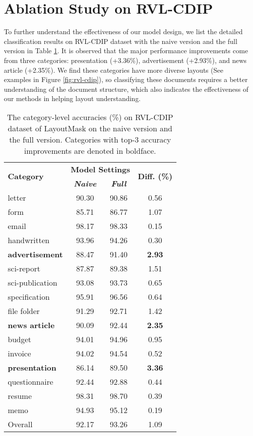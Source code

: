 \documentclass[11pt]{article}
\begin{document}
\section{Ablation Study on RVL-CDIP}
\label{appendix:rvl-cdip}
To further understand the effectiveness of our model design, we list the detailed classification results on RVL-CDIP dataset with the naive version and the full version in Table \ref{table:rvlcdip-compare}.  
It is observed that the major performance improvements come from three categories: presentation (+3.36\%), advertisement (+2.93\%), and news article (+2.35\%).
We find these categories have more diverse layouts (See examples in Figure \ref{fig:rvl-cdip}), so classifying these documents requires a better understanding of the document structure, which also indicates the effectiveness of our methods in helping layout understanding.  





 \begin{table}[!tb]
\centering
\begin{tabular}{l|cc|c}
\hline
\multirow{2}{*}{\textbf{Category}} & \multicolumn{2}{c|}{\textbf{Model Settings}} & \multirow{2}{*}{\textbf{Diff. (\%)}} \\ \cline{2-3}
        & \textbf{\textit{Naive}} & \textbf{\textit{Full}} & \\ \hline
letter         & 90.30      & 90.86   & 0.56 \\
form          & 85.71      & 86.77   & 1.07 \\
email         & 98.17      & 98.33   & 0.15 \\
handwritten      & 93.96      & 94.26   & 0.30 \\
\textbf{advertisement}     & 88.47      & 91.40   & \textbf{2.93} \\
sci-report   & 87.87      & 89.38   & 1.51 \\
sci-publication & 93.08      & 93.73   & 0.65 \\
specification     & 95.91      & 96.56   & 0.64 \\
file folder      & 91.29      & 92.71   & 1.42 \\
\textbf{news article}      & 90.09      & 92.44   & \textbf{2.35} \\
budget         & 94.01      & 94.96   & 0.95 \\
invoice        & 94.02      & 94.54   & 0.52 \\
\textbf{presentation}      & 86.14      &89.50   & \textbf{3.36} \\
questionnaire     & 92.44      & 92.88   & 0.44 \\
resume         & 98.31      & 98.70   & 0.39 \\
memo          & 94.93      & 95.12   & 0.19 \\ \hline
Overall        & 92.17      & 93.26   & 1.09 \\ \hline
\end{tabular}
\caption{\label{table:rvlcdip-compare}
The category-level accuracies (\%) on RVL-CDIP dataset of LayoutMask on the naive version and the full version. Categories with top-3 accuracy improvements are denoted in boldface.
}
\end{table}
\end{document}
